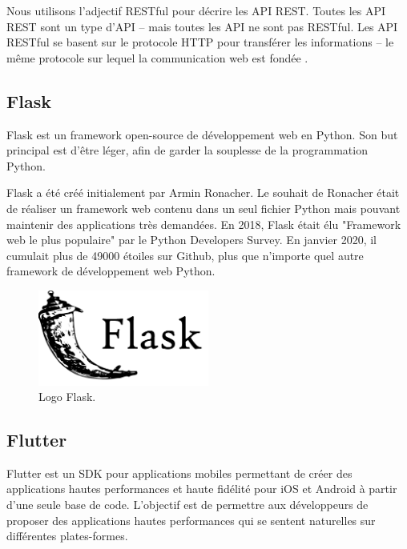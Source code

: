 Nous utilisons l’adjectif RESTful pour décrire les API REST. Toutes les API REST sont un type d’API – mais toutes les API ne sont pas RESTful. Les API RESTful se basent sur le protocole HTTP pour transférer les informations – le même protocole sur lequel la communication web est fondée \cite{IdentifiezAvantagesAPI}.


\subsection{Flask}
Flask \cite{WelcomeFlaskFlask} est un framework open-source de développement web en Python. Son but principal est d'être léger, afin de garder la souplesse de la programmation Python.

Flask a été créé initialement par Armin Ronacher. Le souhait de Ronacher était de réaliser un framework web contenu dans un seul fichier Python mais pouvant maintenir des applications très demandées.
En 2018, Flask était élu "Framework web le plus populaire" par le Python Developers Survey. En janvier 2020, il cumulait plus de 49000 étoiles sur Github, plus que n'importe quel autre framework de développement web Python\cite{FlaskFramework2020}.
\begin{figure}[h!]
    \center
    \includegraphics[width=0.50\textwidth]{Images/chapter3/flask.png}
    \caption{Logo Flask.}
    \label{fig:Technologies}
\end{figure}

\subsection{Flutter}
Flutter \cite{FlutterBeautifulNative} est un SDK pour applications mobiles permettant de créer des applications hautes performances et haute fidélité pour iOS et Android à partir d’une seule base de code.
L’objectif est de permettre aux développeurs de proposer des applications hautes performances qui se sentent naturelles sur différentes plates-formes.

